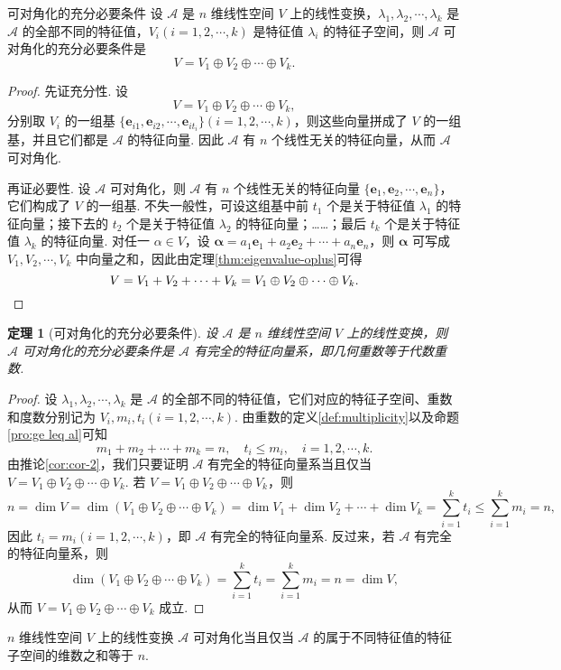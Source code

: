 \documentclass[12pt, a4paper]{ctexart}
\newtheorem{theorem}{\indent 定理}[subsection]
\begin{document}
\begin{corollary}{可对角化的充分必要条件}{}
	设 $ \mathcal{A} $ 是 $ n $ 维线性空间 $ V $ 上的线性变换，$ \lambda_1, \lambda_2, \cdots, \lambda_k $ 是 $ \mathcal{A} $ 的全部不同的特征值，$ V_i (i = 1, 2, \cdots, k) $ 是特征值 $ \lambda_i $ 的特征子空间，则 $ \mathcal{A} $ 可对角化的充分必要条件是
	\[
	V = V_1 \oplus V_2 \oplus \cdots \oplus V_k.
	\]
\end{corollary}
\begin{proof}
	先证充分性. 设
	\[
	V = V_1 \oplus V_2 \oplus \cdots \oplus V_k,
	\]
	分别取 $ V_i $ 的一组基 $ \{\bm e_{i1}, \bm e_{i2}, \cdots, \bm e_{it_i}\} (i = 1, 2, \cdots, k) $，则这些向量拼成了 $ V $ 的一组基，并且它们都是 $ \mathcal{A} $ 的特征向量. 因此 $ \mathcal{A} $ 有 $ n $ 个线性无关的特征向量，从而 $ \mathcal{A} $ 可对角化. 
	
	再证必要性. 设 $ \mathcal{A} $ 可对角化，则 $ \mathcal{A} $ 有 $ n $ 个线性无关的特征向量 $ \{\bm e_1, \bm e_2, \cdots, \bm e_n\} $，它们构成了 $ V $ 的一组基. 不失一般性，可设这组基中前 $ t_1 $ 个是关于特征值 $ \lambda_1 $ 的特征向量；接下去的 $ t_2 $ 个是关于特征值 $ \lambda_2 $ 的特征向量；……；最后 $ t_k $ 个是关于特征值 $ \lambda_k $ 的特征向量. 对任一 $ \alpha \in V $，设 $ \bm\alpha = a_1 \bm e_1 + a_2 \bm e_2 + \cdots + a_n \bm e_n $，则 $\bm\alpha $ 可写成 $ V_1, V_2, \cdots, V_k $ 中向量之和，因此由定理\ref{thm:eigenvalue-oplus}可得
	\[
	V = V_1 + V_2 + \cdots + V_k = V_1 \oplus V_2 \oplus \cdots \oplus V_k. \qedhere
	\]
\end{proof}
\begin{tcolorbox}[pikachu]
	\begin{theorem}[可对角化的充分必要条件]
		设 $ \mathcal A $ 是 $ n $ 维线性空间 $ V $ 上的线性变换，则 $ \mathcal A $ 可对角化的充分必要条件是 $ \mathcal A $ 有完全的特征向量系，即几何重数等于代数重数. 
	\end{theorem}
\end{tcolorbox}
\begin{proof}
	设 $ \lambda_1, \lambda_2, \cdots, \lambda_k $ 是 $ \mathcal A $ 的全部不同的特征值，它们对应的特征子空间、重数和度数分别记为 $ V_i, m_i, t_i (i = 1, 2, \cdots, k) $. 由重数的定义\ref{def:multiplicity}以及命题\ref{pro:ge leq al}可知
	\[
	m_1 + m_2 + \cdots + m_k = n, \quad t_i \leqslant m_i, \quad i = 1, 2, \cdots, k.
	\]
	由推论\ref{cor:cor-2}，我们只要证明 $ \mathcal A $ 有完全的特征向量系当且仅当 $ V = V_1 \oplus V_2 \oplus \cdots \oplus V_k $. 若 $ V = V_1 \oplus V_2 \oplus \cdots \oplus V_k $，则
	\[
	n = \dim V = \dim(V_1 \oplus V_2 \oplus \cdots \oplus V_k) = \dim V_1 + \dim V_2 + \cdots + \dim V_k = \sum_{i=1}^k t_i \leqslant \sum_{i=1}^k m_i = n,
	\]
	因此 $ t_i = m_i (i = 1, 2, \cdots, k) $，即 $ \mathcal A $ 有完全的特征向量系. 反过来，若 $ \mathcal A $ 有完全的特征向量系，则	
	\[
	\dim(V_1 \oplus V_2 \oplus \cdots \oplus V_k) = \sum_{i=1}^k t_i = \sum_{i=1}^k m_i = n = \dim V,
	\]
	从而 $ V = V_1 \oplus V_2 \oplus \cdots \oplus V_k $ 成立. 
\end{proof}
\begin{corollary}{}{}
	$ n $ 维线性空间 $ V $ 上的线性变换 $ \mathcal{A} $ 可对角化当且仅当 $ \mathcal{A} $ 的属于不同特征值的特征子空间的维数之和等于 $ n $. 
\end{corollary}
\end{document}
